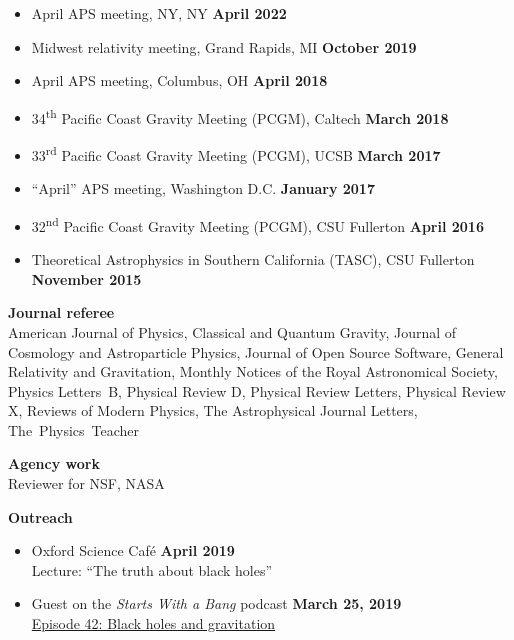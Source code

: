 \documentclass[margin,line]{res}
\begin{document}
\begin{resume}
\begin{itemize}
\item[]
April APS meeting, NY, NY
\hfill {\bf April 2022}
\item[]
Midwest relativity meeting, Grand Rapids, MI
\hfill {\bf October 2019}
\item[]
April APS meeting, Columbus, OH
\hfill {\bf April 2018}
\item[]
34\textsuperscript{th} Pacific Coast Gravity Meeting (PCGM),
Caltech
\hfill {\bf March 2018}
\item[]
33\textsuperscript{rd} Pacific Coast Gravity Meeting (PCGM),
UCSB
\hfill {\bf March 2017}
\item[]
``April'' APS meeting, Washington D.C.
\hfill {\bf January 2017}
\item[]
32\textsuperscript{nd} Pacific Coast Gravity Meeting (PCGM),
CSU Fullerton
\hfill {\bf April 2016}
\item[]
Theoretical Astrophysics in Southern California (TASC),
CSU Fullerton
\hfill {\bf November 2015}
\end{itemize}

{\bf Journal referee}
\vspace*{.05in}\\
\hspace*{1em}
American Journal of Physics,
Classical and Quantum Gravity,
Journal of Cosmology and Astroparticle Physics,
Journal of Open Source Software,
General Relativity and Gravitation,
Monthly Notices of the Royal Astronomical Society,
Physics Letters~B,
Physical Review D,
Physical Review Letters,
Physical Review X,
Reviews of Modern Physics,
The Astrophysical Journal Letters,
The~Physics~Teacher

{\bf Agency work}
\vspace*{.05in}\\
\hspace*{1em}
Reviewer for NSF, NASA

{\bf Outreach}
\vspace*{.05in}
\begin{itemize}

\item[] Oxford Science Café
  \hfill {\bf April 2019} \\
  \hspace*{1em} Lecture: ``The truth about black holes''

\item[] Guest on the {\it Starts With a Bang} podcast
  \hfill {\bf March 25, 2019} \\
  \hspace*{1em}
\href{https://soundcloud.com/ethan-siegel-172073460/starts-with-a-bang-42-black-holes-and-gravitation}{Episode 42: Black holes and gravitation}



\end{itemize}
\end{resume}
\end{document}
